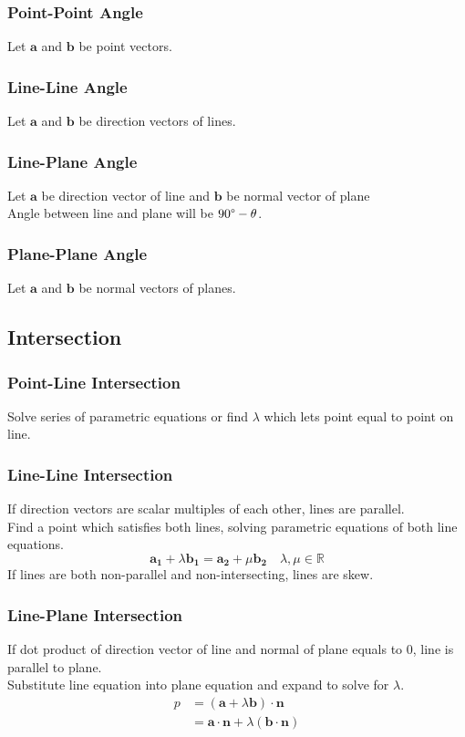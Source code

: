 \documentclass[../main]{subfiles}
\begin{document}
	\subsubsection{Point-Point Angle}
	Let \(\mathbf{a}\) and \(\mathbf{b}\) be point vectors.
	\subsubsection{Line-Line Angle}
	Let \(\mathbf{a}\) and \(\mathbf{b}\) be direction vectors of lines.
	\subsubsection{Line-Plane Angle}
	Let \(\mathbf{a}\) be direction vector of line and \(\mathbf{b}\) be normal vector of plane \\
	Angle between line and plane will be \(90 \degree - \theta\).
	\subsubsection{Plane-Plane Angle}
	Let \(\mathbf{a}\) and \(\mathbf{b}\) be normal vectors of planes.

\subsection{Intersection}
	
	\subsubsection{Point-Line Intersection}
	Solve series of parametric equations or find \(\lambda\) which lets point equal to point on line.
	\subsubsection{Line-Line Intersection}
	If direction vectors are scalar multiples of each other, lines are parallel. \\
	Find a point which satisfies both lines, solving parametric equations of both line equations. \\
	\[ \mathbf{a_1} + \lambda \mathbf{b_1} = \mathbf{a_2} + \mu \mathbf{b_2} \quad \lambda, \mu \in \mathbb{R} \]
	If lines are both non-parallel and non-intersecting, lines are skew.
	\subsubsection{Line-Plane Intersection}
	If dot product of direction vector of line and normal of plane equals to \(0\), line is parallel to plane. \\
	Substitute line equation into plane equation and expand to solve for \(\lambda\).
	\begin{equation*} \begin{split}
		p & = (\mathbf{a} + \lambda \mathbf{b}) \cdot \mathbf{n}  \\
		  & = \mathbf{a} \cdot \mathbf{n} + \lambda (\mathbf{b} \cdot \mathbf{n})
	\end{split} \end{equation*}
\end{document}

